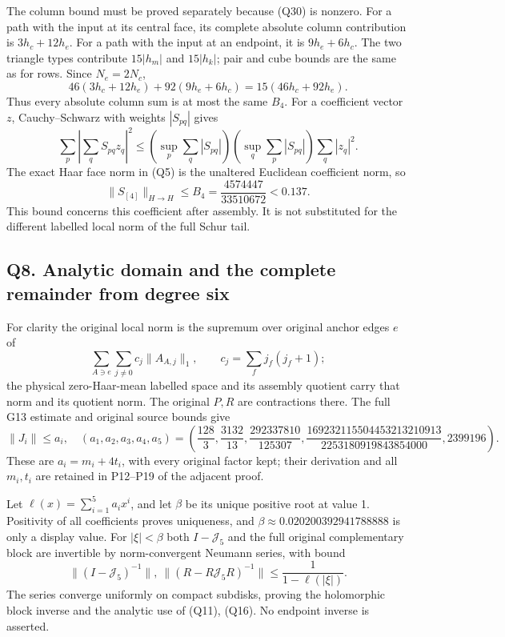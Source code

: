 \documentclass[11pt]{article}
\begin{document}
The column bound must be proved separately because (Q30) is nonzero. For a path with the input at its central face, its complete absolute column contribution is \(3h_c+12h_e\). For a path with the input at an endpoint, it is \(9h_e+6h_c\). The two triangle types contribute \(15|h_m|\) and \(15|h_k|\); pair and cube bounds are the same as for rows. Since \(N_e=2N_c\),
\[
 46(3h_c+12h_e)+92(9h_e+6h_c)
 =15(46h_c+92h_e).
\]
Thus every absolute column sum is at most the same \(B_4\). For a coefficient vector \(z\), Cauchy–Schwarz with weights \(|S_{pq}|\) gives
\[
 \sum_p\left|\sum_qS_{pq}z_q\right|^2
 \le\left(\sup_p\sum_q|S_{pq}|\right)
     \left(\sup_q\sum_p|S_{pq}|\right)\sum_q|z_q|^2.
\]
The exact Haar face norm in (Q5) is the unaltered Euclidean coefficient norm, so
\[
 \boxed{\|S_{[4]}\|_{H\to H}\le B_4
 =\frac{4574447}{33510672}<0.137.}\tag{Q35}
\]
This bound concerns this coefficient after assembly. It is not substituted for the different labelled local norm of the full Schur tail.

\subsection*{Q8. Analytic domain and the complete remainder from degree six}

For clarity the original local norm is the supremum over original anchor edges \(e\) of
\[
 \sum_{A\ni e}\sum_{j\ne0}c_j\|A_{A,j}\|_1,\qquad
 c_j=\sum_fj_f(j_f+1);
\]
the physical zero-Haar-mean labelled space and its assembly quotient carry that norm and its quotient norm. The original \(P,R\) are contractions there. The full G13 estimate and original source bounds give
\[
 \|J_i\|\le a_i,\quad
 (a_1,a_2,a_3,a_4,a_5)=
 \left(\frac{128}{3},\frac{3132}{13},\frac{292337810}{125307},
 \frac{169232115504453213210913}{2253180919843854000},2399196\right).
 \tag{Q36}
\]
These are \(a_i=m_i+4t_i\), with every original factor kept; their derivation and all \(m_i,t_i\) are retained in P12–P19 of the adjacent proof.

Let \(\ell(x)=\sum_{i=1}^5a_ix^i\), and let \(\beta\) be its unique positive root at value 1. Positivity of all coefficients proves uniqueness, and \(\beta\approx0.020200392941788888\) is only a display value. For \(|\xi|<\beta\) both \(I-\mathcal J_5\) and the full original complementary block are invertible by norm-convergent Neumann series, with bound
\[
 \|(I-\mathcal J_5)^{-1}\|,\ {}
 \|(R-R\mathcal J_5R)^{-1}\|
 \le\frac1{1-\ell(|\xi|)} .
 \tag{Q37}
\]
The series converge uniformly on compact subdisks, proving the holomorphic block inverse and the analytic use of (Q11), (Q16). No endpoint inverse is asserted.
\end{document}
